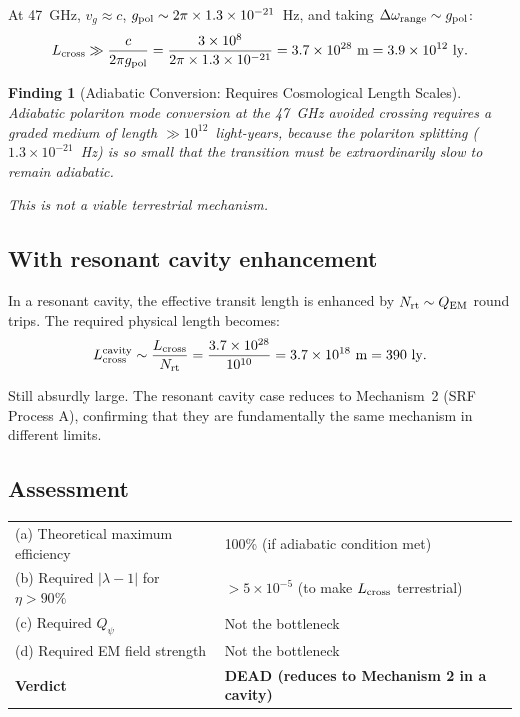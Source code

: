 \documentclass[11pt]{article}
\newtheorem{finding}{Finding}
\newcommand{\ee}[1]{\times 10^{#1}}
\newcommand{\lambdaone}{|\lambda{-}1|}
\newcommand{\Qpsi}{Q_\psi}
\newcommand{\QEM}{Q_{\rm EM}}
\begin{document}
At 47~GHz, $v_g \approx c$, $g_{\rm pol} \sim 2\pi\times 1.3\ee{-21}$~Hz,
and taking $\Delta\omega_{\rm range} \sim g_{\rm pol}$:
\begin{equation}
L_{\rm cross} \gg \frac{c}{2\pi g_{\rm pol}}
= \frac{3\ee{8}}{2\pi\times 1.3\ee{-21}}
= 3.7\ee{28}~\text{m} = 3.9\ee{12}~\text{ly}.
\label{eq:L-cross}
\end{equation}

\begin{finding}[Adiabatic Conversion: Requires Cosmological Length Scales]
\label{find:adiabatic-length}
Adiabatic polariton mode conversion at the 47~GHz avoided crossing
requires a graded medium of length $\gg 10^{12}$~light-years, because
the polariton splitting ($1.3\ee{-21}$~Hz) is so small that the
transition must be extraordinarily slow to remain adiabatic.

This is not a viable terrestrial mechanism.
\end{finding}

\subsection{With resonant cavity enhancement}

In a resonant cavity, the effective transit length is enhanced by
$N_{\rm rt} \sim \QEM$ round trips. The required physical length
becomes:
\begin{equation}
L_{\rm cross}^{\rm cavity} \sim \frac{L_{\rm cross}}{N_{\rm rt}}
= \frac{3.7\ee{28}}{10^{10}} = 3.7\ee{18}~\text{m} = 390~\text{ly}.
\end{equation}

Still absurdly large. The resonant cavity case reduces to Mechanism~2
(SRF Process A), confirming that they are fundamentally the same
mechanism in different limits.

\subsection{Assessment}

\begin{center}
\begin{tabular}{ll}
\toprule
(a) Theoretical maximum efficiency & 100\% (if adiabatic condition met) \\
(b) Required $\lambdaone$ for $\eta > 90\%$ & $>5\ee{-5}$ (to make $L_{\rm cross}$ terrestrial) \\
(c) Required $\Qpsi$ & Not the bottleneck \\
(d) Required EM field strength & Not the bottleneck \\
\midrule
\textbf{Verdict} & \textbf{DEAD (reduces to Mechanism 2 in a cavity)} \\
\bottomrule
\end{tabular}
\end{center}
\end{document}
